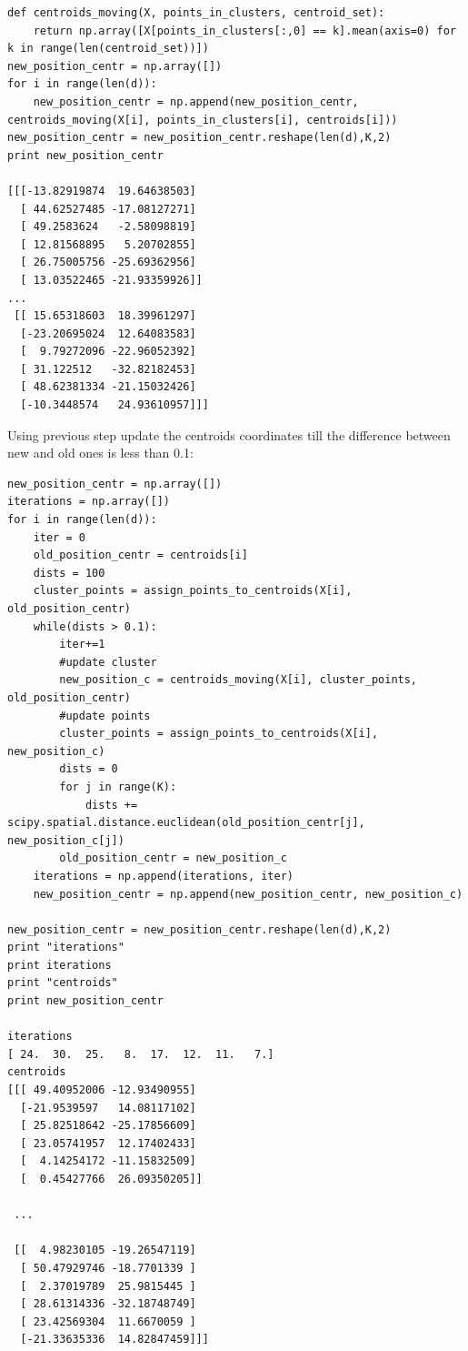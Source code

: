 \documentclass[a4paper, 12pt]{article}
\begin{document}
\begin{lstlisting}
def centroids_moving(X, points_in_clusters, centroid_set):
    return np.array([X[points_in_clusters[:,0] == k].mean(axis=0) for k in range(len(centroid_set))])
new_position_centr = np.array([])
for i in range(len(d)):
    new_position_centr = np.append(new_position_centr, centroids_moving(X[i], points_in_clusters[i], centroids[i]))
new_position_centr = new_position_centr.reshape(len(d),K,2)
print new_position_centr

[[[-13.82919874  19.64638503]
  [ 44.62527485 -17.08127271]
  [ 49.2583624   -2.58098819]
  [ 12.81568895   5.20702855]
  [ 26.75005756 -25.69362956]
  [ 13.03522465 -21.93359926]]
...
 [[ 15.65318603  18.39961297]
  [-23.20695024  12.64083583]
  [  9.79272096 -22.96052392]
  [ 31.122512   -32.82182453]
  [ 48.62381334 -21.15032426]
  [-10.3448574   24.93610957]]]
\end{lstlisting}

Using previous step update the centroids coordinates till the difference between new and old ones is less than 0.1:

\begin{lstlisting}
new_position_centr = np.array([])
iterations = np.array([])
for i in range(len(d)):
    iter = 0
    old_position_centr = centroids[i]
    dists = 100
    cluster_points = assign_points_to_centroids(X[i], old_position_centr)
    while(dists > 0.1):
        iter+=1
        #update cluster
        new_position_c = centroids_moving(X[i], cluster_points, old_position_centr)
        #update points
        cluster_points = assign_points_to_centroids(X[i], new_position_c)
        dists = 0
        for j in range(K):
            dists += scipy.spatial.distance.euclidean(old_position_centr[j], new_position_c[j])
        old_position_centr = new_position_c
    iterations = np.append(iterations, iter)    
    new_position_centr = np.append(new_position_centr, new_position_c)
    
new_position_centr = new_position_centr.reshape(len(d),K,2)
print "iterations"
print iterations
print "centroids"
print new_position_centr

iterations
[ 24.  30.  25.   8.  17.  12.  11.   7.]
centroids
[[[ 49.40952006 -12.93490955]
  [-21.9539597   14.08117102]
  [ 25.82518642 -25.17856609]
  [ 23.05741957  12.17402433]
  [  4.14254172 -11.15832509]
  [  0.45427766  26.09350205]]

 ...

 [[  4.98230105 -19.26547119]
  [ 50.47929746 -18.7701339 ]
  [  2.37019789  25.9815445 ]
  [ 28.61314336 -32.18748749]
  [ 23.42569304  11.6670059 ]
  [-21.33635336  14.82847459]]]
\end{lstlisting}
\end{document}
